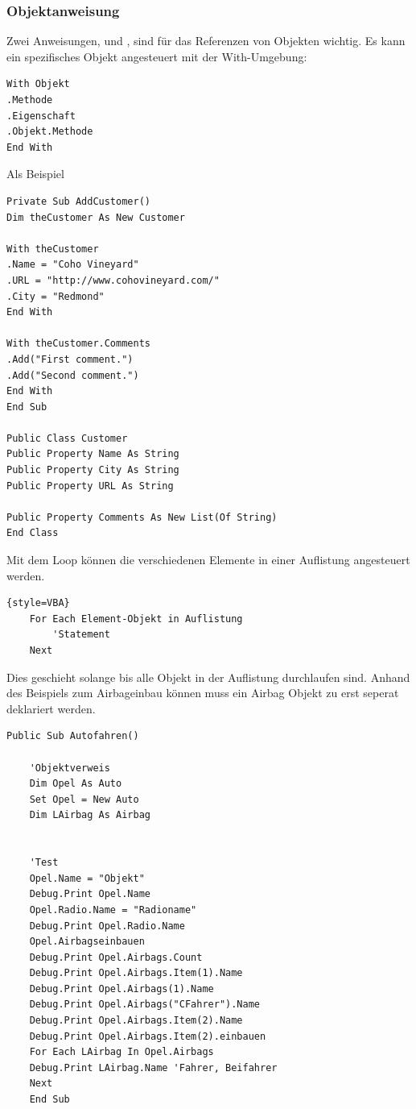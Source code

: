 \subsubsection{Objektanweisung}
Zwei Anweisungen,  und , sind für das Referenzen von Objekten wichtig.
Es kann ein spezifisches Objekt angesteuert mit der With-Umgebung:
\begin{lstlisting}[style=VBA]
With Objekt 
.Methode
.Eigenschaft
.Objekt.Methode
End With
\end{lstlisting}
Als Beispiel
\begin{lstlisting}[style=VBA]
Private Sub AddCustomer()
Dim theCustomer As New Customer

With theCustomer
.Name = "Coho Vineyard"
.URL = "http://www.cohovineyard.com/"
.City = "Redmond"
End With

With theCustomer.Comments
.Add("First comment.")
.Add("Second comment.")
End With
End Sub

Public Class Customer
Public Property Name As String
Public Property City As String
Public Property URL As String

Public Property Comments As New List(Of String)
End Class
\end{lstlisting}
Mit dem  Loop können die verschiedenen Elemente in einer Auflistung angesteuert werden.
\begin{lstlisting}{style=VBA}
	For Each Element-Objekt in Auflistung
		'Statement
	Next
\end{lstlisting}
Dies geschieht solange bis alle Objekt in der Auflistung durchlaufen sind.
Anhand des Beispiels zum Airbageinbau können muss ein Airbag Objekt zu erst seperat deklariert werden.
\begin{lstlisting}[style=VBA]
	Public Sub Autofahren()
	
	'Objektverweis
	Dim Opel As Auto
	Set Opel = New Auto
	Dim LAirbag As Airbag
	
	
	'Test
	Opel.Name = "Objekt"
	Debug.Print Opel.Name
	Opel.Radio.Name = "Radioname"
	Debug.Print Opel.Radio.Name
	Opel.Airbagseinbauen
	Debug.Print Opel.Airbags.Count
	Debug.Print Opel.Airbags.Item(1).Name
	Debug.Print Opel.Airbags(1).Name
	Debug.Print Opel.Airbags("CFahrer").Name
	Debug.Print Opel.Airbags.Item(2).Name
	Debug.Print Opel.Airbags.Item(2).einbauen
	For Each LAirbag In Opel.Airbags
	Debug.Print LAirbag.Name 'Fahrer, Beifahrer
	Next
	End Sub
\end{lstlisting}


